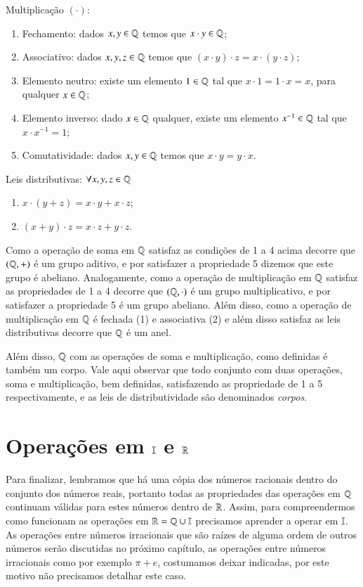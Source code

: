   Multiplicação $(\cdot)$:
 \begin{enumerate}[1)]
 \item Fechamento: dados $x, y \in \mathbb{Q}$ temos que $x \cdot y \in \mathbb{Q}$;
 \item Associativo: dados $x, y, z \in \mathbb{Q}$ temos que $(x \cdot y) \cdot z= x \cdot (y \cdot z)$;
 \item Elemento neutro: existe um elemento $1 \in \mathbb{Q}$ tal que $x \cdot 1= 1 \cdot x= x$, para qualquer $x \in \mathbb{Q}$;
 \item Elemento inverso: dado $x \in \mathbb{Q}$ qualquer, existe um elemento $x^{-1} \in \mathbb{Q}$ tal que $x \cdot x^{-1}= 1$;
 \item Comutatividade: dados $x, y \in \mathbb{Q}$ temos que $x \cdot y= y \cdot x$.
 \end{enumerate}

  Leis distributivas: $\forall x, y, z \in \mathbb{Q}$
 \begin{enumerate}[1)]
 \item $x \cdot (y + z)= x \cdot y + x \cdot z$;
 \item $(x + y) \cdot z= x \cdot z + y \cdot z$.
 \end{enumerate}

  Como a operação de soma em $\mathbb{Q}$ satisfaz as condições de 1 a 4 acima decorre que $(\mathbb{Q}, +)$ é um grupo aditivo, e por satisfazer a propriedade 5 dizemos que este grupo é abeliano. Analogamente, como a operação de multiplicação em $\mathbb{Q}$ satisfaz as propriedades de 1 a 4 decorre que $(\mathbb{Q}, \cdot)$ é um grupo multiplicativo, e por satisfazer a propriedade 5 é um grupo abeliano. Além disso, como a operação de multiplicação em $\mathbb{Q}$ é fechada (1) e associativa (2) e além disso satisfaz as leis distributivas decorre que $\mathbb{Q}$ é um anel.

  Além disso, $\mathbb{Q}$ com as operações de soma e multiplicação, como definidas é também um corpo. Vale aqui observar que todo conjunto com duas operações, soma e multiplicação, bem definidas, satisfazendo as propriedade de 1 a 5 respectivamente, e as leis de distributividade são denominados \emph{corpos}.

 \section{Operações em \texorpdfstring{$\mathbb{I}$}{I} e \texorpdfstring{$\mathbb{R}$}{R}}

 Para finalizar, lembramos que há uma cópia dos números racionais dentro do conjunto dos números reais, portanto todas as propriedades das operações em $\mathbb{Q}$ continuam válidas para estes números dentro de $\mathbb{R}$. Assim, para compreendermos como funcionam as operações em $\mathbb{R}= \mathbb{Q} \cup \mathbb{I}$ precisamos aprender a operar em $\mathbb{I}$. As operações entre números irracionais que são raízes de alguma ordem de outros números serão discutidas no próximo capítulo, as operações entre números irracionais como por exemplo $\pi + e$, costumamos deixar indicadas, por este motivo não precisamos detalhar este caso.

